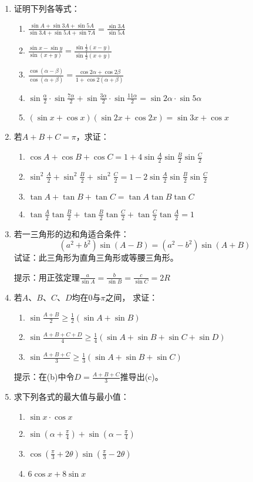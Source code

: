 \begin{enumerate}
\item 证明下列各等式：
\begin{enumerate}
\item $\frac{\sin A+\sin 3 A+\sin 5 A}{\sin 3 A+\sin 5 A+\sin 7 A}=\frac{\sin 3 A}{\sin 5 A}$
\item $\frac{\sin x-\sin y}{\sin (x+y)}=\frac{\sin \frac{1}{2}(x-y)}{\sin \frac{1}{2}(x+y)}$
\item $\frac{\cos(\alpha-\beta)}{\cos(\alpha+\beta)}=\frac{\cos2\alpha+\cos2\beta}{1+\cos 2(\alpha+\beta)}$
\item $\sin\frac{\alpha}{2}\cdot \sin\frac{7\alpha}{2}+\sin\frac{3\alpha}{2}\cdot\sin\frac{11\alpha}{2}=\sin2\alpha\cdot \sin 5\alpha$
\item $(\sin x+\cos x)(\sin 2x+\cos 2x)=\sin3x+\cos x$
\end{enumerate}

\item 若$A+B+C=\pi$，求证：
\begin{enumerate}
    \item $\cos A+\cos B+\cos C=1+4\sin\frac{A}{2}\sin\frac{B}{2}\sin\frac{C}{2}$
    \item $\sin^2\frac{A}{2}+\sin^2\frac{B}{2}+\sin^2\frac{C}{2}=1-2\sin\frac{A}{2}\sin\frac{B}{2}\sin\frac{C}{2}$
    \item $\tan A+\tan B+\tan C=\tan A\tan B\tan C$
    \item $\tan\frac{A}{2}\tan\frac{B}{2}+\tan\frac{B}{2}\tan\frac{C}{2}+\tan\frac{C}{2}\tan\frac{A}{2}=1$
\end{enumerate}

\item 若一三角形的边和角适合条件：
\[(a^2+b^2) \sin(A-B) =(a^2-b^2)\sin(A+B)\]
试证：此三角形为直角三角形或等腰三角形。

提示：用正弦定理$\frac{a}{\sin A}=\frac{b}{\sin B}=\frac{c}{\sin C}=2R$
\item 若$A$、$B$、$C$、$D$均在0与$\pi$之间，
求证：
\begin{enumerate}
    \item $\sin\frac{A+B}{2}\ge \frac{1}{2}(\sin A+\sin B)$
    \item $\sin\frac{A+B+C+D}{4}\ge \frac{1}{4}(\sin A+\sin B+\sin C+\sin D)$
    \item $\sin\frac{A+B+C}{3}\ge \frac{1}{3}(\sin A+\sin B+\sin C)$
\end{enumerate}
提示：在(b)中令$D=\frac{A+B+C}{3}$推导出(c)。

\item 求下列各式的最大值与最小值：
\begin{multicols}{2}
\begin{enumerate}
    \item $\sin x\cdot \cos x$
    \item $\sin\left(\alpha+\frac{\pi}{4}\right)+\sin\left(\alpha-\frac{\pi}{4}\right)$
    \item $\cos\left(\frac{\pi}{3}+2\theta\right)\sin\left(\frac{\pi}{3}-2\theta\right)$
    \item $6\cos x+8\sin x$
\end{enumerate}
\end{multicols}
\end{enumerate}

